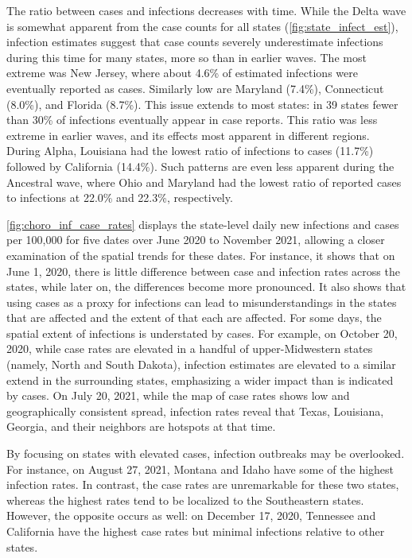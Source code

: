 The ratio between cases and infections decreases with time. While the Delta wave
is somewhat apparent from the case counts for all states
(\autoref{fig:state_infect_est}), infection estimates suggest that case counts
severely underestimate infections during this time for many states, more so than
in earlier waves. The most extreme was New Jersey, where about 4.6\% of
estimated infections were eventually reported as cases. Similarly low are
Maryland (7.4\%), Connecticut (8.0\%), and Florida (8.7\%). This issue extends
to most states: in 39 states fewer than 30\% of infections eventually appear in
case reports. This ratio was less extreme in earlier waves, and its effects most
apparent in different regions. During Alpha, Louisiana had the lowest ratio of
infections to cases (11.7\%) followed by California (14.4\%). Such patterns are
even less apparent during the Ancestral wave, where Ohio and Maryland had the
lowest ratio of reported cases to infections at 22.0\% and 22.3\%,
respectively. 

\autoref{fig:choro_inf_case_rates} displays the
state-level daily new infections and cases per 100,000 for five dates over
June 2020 to November 2021, 
allowing a closer examination of the spatial trends for these dates.
For instance, it shows that on June 1, 2020, there is little
difference between case and infection rates across the states, while later on,
the differences become more pronounced. It also shows that 
using cases as a proxy for infections can lead to misunderstandings in the 
states that are affected and the extent of that each are affected.
For some days, the spatial extent of infections is understated by
cases. For example, on October 20, 2020, while case rates are elevated in a
handful of upper-Midwestern states (namely, North and South Dakota), infection
estimates are elevated to a similar extend in the surrounding states, emphasizing a
wider impact than is indicated by cases. On July 20, 2021, while the
map of case rates shows low and geographically consistent spread, infection
rates reveal that Texas, Louisiana, Georgia, and their neighbors are hotspots at
that time. 

By focusing on states with elevated cases, infection outbreaks may be
overlooked. For instance, on August 27, 2021, Montana and Idaho have some of the
highest infection rates. In contrast, the case rates are unremarkable for these
two states, whereas the highest rates tend to be localized to the Southeastern
states. However, the opposite occurs as well: on December
17, 2020, Tennessee and California have the highest case rates but minimal
infections relative to other states.

